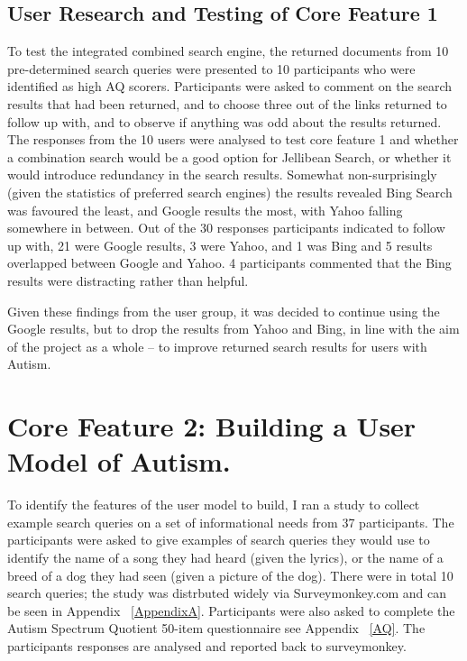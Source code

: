 \documentclass[a4paper, 11pt]{article}
\begin{document}
\subsection{User Research and Testing of Core Feature 1}
To test the integrated combined search engine, the returned documents from 10 pre-determined search queries were presented to 10 participants who were identified as high AQ scorers. Participants were asked to comment on the search results that had been returned, and to choose three out of the links returned to follow up with, and to observe if anything was odd about the results returned. The responses from the 10 users were analysed to test core feature 1 and whether a combination search would be a good option for Jellibean Search, or whether it would introduce redundancy in the search results. 
Somewhat non-surprisingly (given the statistics of preferred search engines) the results revealed Bing Search was favoured the least, and Google results the most, with Yahoo falling somewhere in between. Out of the 30 responses participants indicated to follow up with, 21 were Google results, 3 were Yahoo, and 1 was Bing and 5 results overlapped between Google and Yahoo.
4 participants commented that the Bing results were distracting rather than helpful.

Given these findings from the user group, it was decided to continue using the Google results, but to drop the results from Yahoo and Bing, in line with the aim of the project as a whole – to improve returned search results for users with Autism.



\section{Core Feature 2: Building a User Model of Autism.}
To identify the features of the user model to build, I ran a study to collect example search queries on a set of informational needs from 37 participants. The participants were asked to give examples of search queries they would use to identify the name of a song they had heard (given the lyrics), or the name of a breed of a dog they had seen (given a picture of the dog). There were in total 10 search queries; the study was distrbuted widely via Surveymonkey.com \cite{surveymonkey} and can be seen in Appendix ~\ref{AppendixA}. Participants were also asked to complete the Autism Spectrum Quotient 50-item questionnaire see Appendix ~\ref{AQ}. The participants responses are analysed and reported back to surveymonkey.
\end{document}
